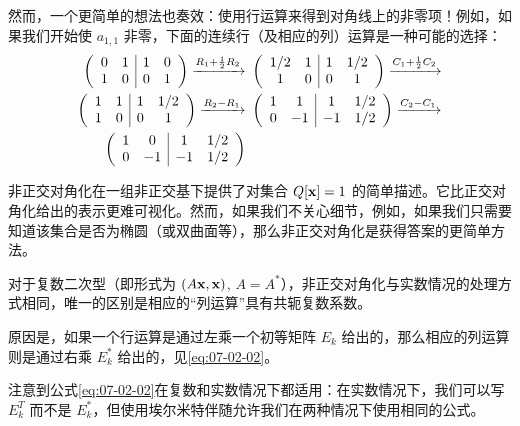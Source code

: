 然而，一个更简单的想法也奏效：使用行运算来得到对角线上的非零项！例如，如果我们开始使 $a_{1,1}$ 非零，下面的连续行（及相应的列）运算是一种可能的选择：
\begin{equation}
\notag
\begin{split}
\left(\begin{array}{cc|cc} 0 & 1 & 1 & 0 \\ 1 & 0 & 0 & 1 \end{array}\right) \xrightarrow{R_1+ \frac{1}{2}R_2}
&\ \left(\begin{array}{cc|cc} 1/2 & 1 & 1 & 1/2 \\ 1 & 0 & 0 & 1 \end{array}\right) \xrightarrow{C_1+ \frac{1}{2}C_2} \\
\left(\begin{array}{cc|cc} 1 & 1 & 1 & 1/2 \\ 1 & 0 & 0 & 1 \end{array}\right) \xrightarrow{R_2-R_1}
&\ \left(\begin{array}{cc|cc} 1 & 1 & 1 & 1/2 \\ 0 & -1 & -1 & 1/2 \end{array}\right)\xrightarrow{C_2-C_1}\\
\left(\begin{array}{cc|cc} 1 & 0 & 1 & 1/2 \\ 0 & -1 & -1 & 1/2 \end{array}\right)
\end{split}
\end{equation}


\begin{remark*}
非正交对角化在一组非正交基下提供了对集合 $Q[\mathbf{x}] = 1$ 的简单描述。它比正交对角化给出的表示更难可视化。然而，如果我们不关心细节，例如，如果我们只需要知道该集合是否为椭圆（或双曲面等），那么非正交对角化是获得答案的更简单方法。
\end{remark*}

\begin{remark}\label{stmt:07-02-01}
对于复数二次型（即形式为 $(A\mathbf{x}, \mathbf{x})$, $A = A^*$），非正交对角化与实数情况的处理方式相同，唯一的区别是相应的“列运算”具有共轭复数系数。
\end{remark}

原因是，如果一个行运算是通过左乘一个初等矩阵 $E_k$ 给出的，那么相应的列运算则是通过右乘 $E_k^*$ 给出的，见\eqref{eq:07-02-02}。

注意到公式\eqref{eq:07-02-02}在复数和实数情况下都适用：在实数情况下，我们可以写 $E_k^T$ 而不是 $E_k^*$，但使用埃尔米特伴随允许我们在两种情况下使用相同的公式。

